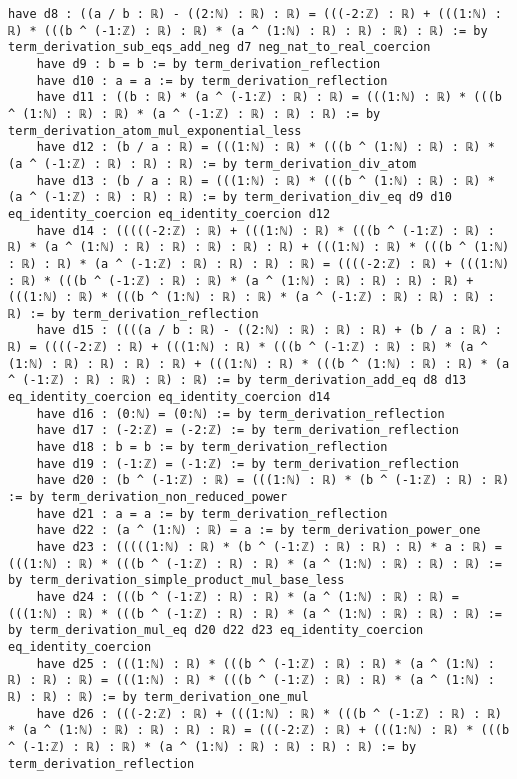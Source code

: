 \documentclass{article}
\begin{document}
\begin{tcolorbox}[colback=white!10, width=\linewidth]
\begin{lstlisting}[language=Lean4]
    have d8 : ((a / b : ℝ) - ((2:ℕ) : ℝ) : ℝ) = (((-2:ℤ) : ℝ) + (((1:ℕ) : ℝ) * (((b ^ (-1:ℤ) : ℝ) : ℝ) * (a ^ (1:ℕ) : ℝ) : ℝ) : ℝ) : ℝ) := by term_derivation_sub_eqs_add_neg d7 neg_nat_to_real_coercion
    have d9 : b = b := by term_derivation_reflection
    have d10 : a = a := by term_derivation_reflection
    have d11 : ((b : ℝ) * (a ^ (-1:ℤ) : ℝ) : ℝ) = (((1:ℕ) : ℝ) * (((b ^ (1:ℕ) : ℝ) : ℝ) * (a ^ (-1:ℤ) : ℝ) : ℝ) : ℝ) := by term_derivation_atom_mul_exponential_less
    have d12 : (b / a : ℝ) = (((1:ℕ) : ℝ) * (((b ^ (1:ℕ) : ℝ) : ℝ) * (a ^ (-1:ℤ) : ℝ) : ℝ) : ℝ) := by term_derivation_div_atom
    have d13 : (b / a : ℝ) = (((1:ℕ) : ℝ) * (((b ^ (1:ℕ) : ℝ) : ℝ) * (a ^ (-1:ℤ) : ℝ) : ℝ) : ℝ) := by term_derivation_div_eq d9 d10 eq_identity_coercion eq_identity_coercion d12
    have d14 : (((((-2:ℤ) : ℝ) + (((1:ℕ) : ℝ) * (((b ^ (-1:ℤ) : ℝ) : ℝ) * (a ^ (1:ℕ) : ℝ) : ℝ) : ℝ) : ℝ) : ℝ) + (((1:ℕ) : ℝ) * (((b ^ (1:ℕ) : ℝ) : ℝ) * (a ^ (-1:ℤ) : ℝ) : ℝ) : ℝ) : ℝ) = ((((-2:ℤ) : ℝ) + (((1:ℕ) : ℝ) * (((b ^ (-1:ℤ) : ℝ) : ℝ) * (a ^ (1:ℕ) : ℝ) : ℝ) : ℝ) : ℝ) + (((1:ℕ) : ℝ) * (((b ^ (1:ℕ) : ℝ) : ℝ) * (a ^ (-1:ℤ) : ℝ) : ℝ) : ℝ) : ℝ) := by term_derivation_reflection
    have d15 : ((((a / b : ℝ) - ((2:ℕ) : ℝ) : ℝ) : ℝ) + (b / a : ℝ) : ℝ) = ((((-2:ℤ) : ℝ) + (((1:ℕ) : ℝ) * (((b ^ (-1:ℤ) : ℝ) : ℝ) * (a ^ (1:ℕ) : ℝ) : ℝ) : ℝ) : ℝ) + (((1:ℕ) : ℝ) * (((b ^ (1:ℕ) : ℝ) : ℝ) * (a ^ (-1:ℤ) : ℝ) : ℝ) : ℝ) : ℝ) := by term_derivation_add_eq d8 d13 eq_identity_coercion eq_identity_coercion d14
    have d16 : (0:ℕ) = (0:ℕ) := by term_derivation_reflection
    have d17 : (-2:ℤ) = (-2:ℤ) := by term_derivation_reflection
    have d18 : b = b := by term_derivation_reflection
    have d19 : (-1:ℤ) = (-1:ℤ) := by term_derivation_reflection
    have d20 : (b ^ (-1:ℤ) : ℝ) = (((1:ℕ) : ℝ) * (b ^ (-1:ℤ) : ℝ) : ℝ) := by term_derivation_non_reduced_power
    have d21 : a = a := by term_derivation_reflection
    have d22 : (a ^ (1:ℕ) : ℝ) = a := by term_derivation_power_one
    have d23 : (((((1:ℕ) : ℝ) * (b ^ (-1:ℤ) : ℝ) : ℝ) : ℝ) * a : ℝ) = (((1:ℕ) : ℝ) * (((b ^ (-1:ℤ) : ℝ) : ℝ) * (a ^ (1:ℕ) : ℝ) : ℝ) : ℝ) := by term_derivation_simple_product_mul_base_less
    have d24 : (((b ^ (-1:ℤ) : ℝ) : ℝ) * (a ^ (1:ℕ) : ℝ) : ℝ) = (((1:ℕ) : ℝ) * (((b ^ (-1:ℤ) : ℝ) : ℝ) * (a ^ (1:ℕ) : ℝ) : ℝ) : ℝ) := by term_derivation_mul_eq d20 d22 d23 eq_identity_coercion eq_identity_coercion
    have d25 : (((1:ℕ) : ℝ) * (((b ^ (-1:ℤ) : ℝ) : ℝ) * (a ^ (1:ℕ) : ℝ) : ℝ) : ℝ) = (((1:ℕ) : ℝ) * (((b ^ (-1:ℤ) : ℝ) : ℝ) * (a ^ (1:ℕ) : ℝ) : ℝ) : ℝ) := by term_derivation_one_mul
    have d26 : (((-2:ℤ) : ℝ) + (((1:ℕ) : ℝ) * (((b ^ (-1:ℤ) : ℝ) : ℝ) * (a ^ (1:ℕ) : ℝ) : ℝ) : ℝ) : ℝ) = (((-2:ℤ) : ℝ) + (((1:ℕ) : ℝ) * (((b ^ (-1:ℤ) : ℝ) : ℝ) * (a ^ (1:ℕ) : ℝ) : ℝ) : ℝ) : ℝ) := by term_derivation_reflection

\end{lstlisting}
\end{tcolorbox}
\end{document}
